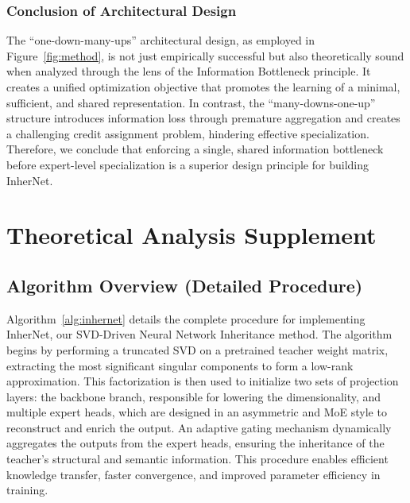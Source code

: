 \documentclass{article} %
\begin{document}
\subsubsection{Conclusion of Architectural Design}

The ``one-down-many-ups'' architectural design, as employed in Figure~\ref{fig:method}, is not just empirically successful but also theoretically sound when analyzed through the lens of the Information Bottleneck principle. It creates a unified optimization objective that promotes the learning of a minimal, sufficient, and shared representation. In contrast, the ``many-downs-one-up'' structure introduces information loss through premature aggregation and creates a challenging credit assignment problem, hindering effective specialization. Therefore, we conclude that enforcing a single, shared information bottleneck before expert-level specialization is a superior design principle for building InherNet.




\section{Theoretical Analysis Supplement}
\label{app:all}

\subsection{Algorithm Overview (Detailed Procedure)}
\label{app:algo}


Algorithm~\ref{alg:inhernet} details the complete procedure for implementing InherNet, our SVD-Driven Neural Network Inheritance method. The algorithm begins by performing a truncated SVD on a pretrained teacher weight matrix, extracting the most significant singular components to form a low-rank approximation. This factorization is then used to initialize two sets of projection layers: the backbone branch, responsible for lowering the dimensionality, and multiple expert heads, which are designed in an asymmetric and MoE style to reconstruct and enrich the output. An adaptive gating mechanism dynamically aggregates the outputs from the expert heads, ensuring the inheritance of the teacher's structural and semantic information. This procedure enables efficient knowledge transfer, faster convergence, and improved parameter efficiency in training.
\end{document}
